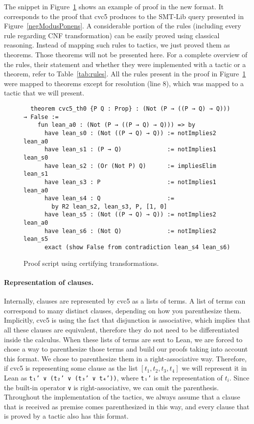 The snippet in Figure~\ref{notModusPonens2} shows an example of proof in the new format.
It corresponds to the proof that cvc5 produces to the SMT-Lib query presented
in Figure~\ref{negModusPonens}. A considerable portion of the rules (including
every rule regarding CNF transformation) can be easily proved using classical
reasoning. Instead of mapping such rules to tactics, we just proved them as theorems.
Those theorems will not be presented here. For a complete overview of the rules, their
statement and whether they were implemented with a tactic or a
theorem, refer to Table~\ref{tab:rules}.
All the rules present in the proof in Figure~\ref{notModusPonens2} were mapped to
theorems except for resolution (line 8), which was mapped to a tactic that we will
present.


\begin{figure}[t]
\begin{verbatim}
  theorem cvc5_th0 {P Q : Prop} : (Not (P → ((P → Q) → Q))) → False :=
    fun lean_a0 : (Not (P → ((P → Q) → Q))) => by
      have lean_s0 : (Not ((P → Q) → Q)) := notImplies2 lean_a0
      have lean_s1 : (P → Q)             := notImplies1 lean_s0
      have lean_s2 : (Or (Not P) Q)      := impliesElim lean_s1
      have lean_s3 : P                   := notImplies1 lean_a0
      have lean_s4 : Q                   :=
        by R2 lean_s2, lean_s3, P, [1, 0]
      have lean_s5 : (Not ((P → Q) → Q)) := notImplies2 lean_a0
      have lean_s6 : (Not Q)             := notImplies2 lean_s5
      exact (show False from contradiction lean_s4 lean_s6)
\end{verbatim}
\caption{Proof script using certifying transformations.}\label{notModusPonens2}
\end{figure}

\paragraph{Representation of clauses.} Internally, clauses are represented by cvc5 as
a lists of terms. A list of terms can correspond to many distinct
clauses, depending on how you parenthesize them. Implicitly, cvc5 is using the
fact that disjunction is associative, which implies that all these clauses
are equivalent, therefore they do not need to be differentiated inside the calculus.
When these lists of terms are sent to Lean, we are forced to chose a way to parenthesize
those terms and build our proofs taking into account this format.
We chose to parenthesize them in a right-associative way.
Therefore, if cvc5 is
representing some clause as the list $[t_{1}, t_{2}, t_{3}, t_{4}]$ we will represent it in Lean as
\texttt{t₁' ∨ (t₂' ∨ (t₃' ∨ t₄'))}, where \texttt{tᵢ'} is the representation of $t_{i}$.
Since the built-in operator \texttt{∨} is right-associative, we can omit the
parenthesis. Throughout the implementation of the tactics, we always assume
that a clause that is received as premise comes parenthesized in this way,
and every clause that is proved by a tactic also has this format.

